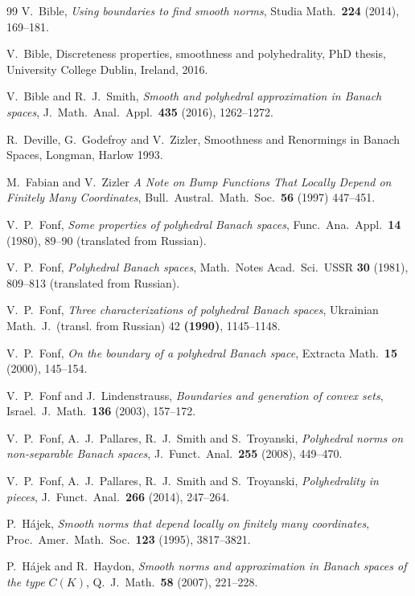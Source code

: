 \documentclass[12pt,reqno]{amsart}
\theoremstyle{definition}
\begin{document}
\begin{thebibliography}{99}
 V.~Bible, {\em Using boundaries to find smooth norms}, Studia Math.~\textbf{224} (2014), 169--181.

 V.~Bible, Discreteness properties, smoothness and polyhedrality, PhD thesis, University College Dublin, Ireland, 2016.

 V.~Bible and R.~J.~Smith, {\em Smooth and polyhedral approximation in Banach spaces}, J.~Math.~Anal.~Appl.~\textbf{435} (2016), 1262--1272.

 R.\ Deville, G.\ Godefroy and V.\ Zizler, Smoothness and Renormings in Banach Spaces, Longman, Harlow 1993.

 M.~Fabian and V.~Zizler {\em A Note on Bump Functions That Locally Depend on Finitely Many Coordinates}, Bull.~Austral.~Math.~Soc.~\textbf{56} (1997) 447--451.

 V.~P.~Fonf, {\em Some properties of polyhedral Banach spaces}, Func.~Ana.~Appl.~\textbf{14} (1980), 89--90 (translated from
Russian).

 V.~P.~Fonf, {\em Polyhedral Banach spaces}, Math.~Notes Acad.~Sci.~USSR \textbf{30} (1981), 809--813 (translated from Russian).

 V.~P.~Fonf, {\em Three characterizations of polyhedral Banach spaces}, Ukrainian Math.~J.~(transl. from Russian) 42 \textbf{(1990)}, 1145--1148.

 V.~P.~Fonf, {\em On the boundary of a polyhedral Banach space}, Extracta Math.~\textbf{15} (2000), 145--154.

 V.~P.~Fonf and J.~Lindenstrauss, {\em Boundaries and generation of convex sets}, Israel.~J.~Math.~\textbf{136} (2003), 157--172.

 V.~P.~Fonf, A.~J.~Pallares, R.~J.~Smith and S.~Troyanski, {\em Polyhedral norms on non-separable Banach spaces}, J.~Funct.~Anal.~\textbf{255} (2008), 449--470.

 V.~P.~Fonf, A.~J.~Pallares, R.~J.~Smith and S.~Troyanski, {\em Polyhedrality in pieces}, J.~Funct.~Anal.~\textbf{266} (2014), 247--264.

 P.~H\'ajek, {\em Smooth norms that depend locally on finitely many coordinates}, Proc.~Amer.~Math.~Soc.~\textbf{123} (1995), 3817--3821.

 P.~H\'ajek and R.~Haydon, {\em Smooth norms and approximation in Banach spaces of the type $C(K)$}, Q.~J.~Math.~\textbf{58} (2007), 221--228.


\end{thebibliography}
\end{document}
